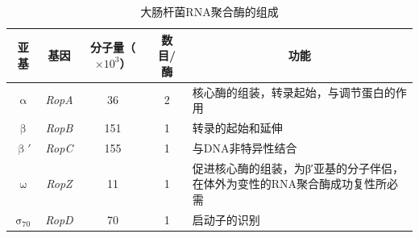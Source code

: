 \begin{table}[h]
	\centering
	\begin{tabular}{|c|c|c|c|m{15em}|}
		\hline
		\textbf{亚基} & \textbf{基因} & \textbf{分子量（$\displaystyle\times 10^{3}$）} & 数目/酶 & \multicolumn{1}{c|}{\textbf{功能}} \\ \hline
		$\upalpha$ & \textit{RopA} & 36 & 2 & 核心酶的组装，转录起始，与调节蛋白的作用 \\ \hline
		$\upbeta$ & \textit{RopB} & 151 & 1 & 转录的起始和延伸 \\ \hline
		$\upbeta'$ & \textit{RopC} & 155 & 1 & 与DNA非特异性结合 \\ \hline
		$\upomega$ & \textit{RopZ} & 11 & 1 & 促进核心酶的组装，为β′亚基的分子伴侣，在体外为变性的RNA聚合酶成功复性所必需 \\ \hline
		$\upsigma_{70}$ & \textit{RopD} & 70 & 1 & 启动子的识别 \\ \hline
	\end{tabular}
	\caption{大肠杆菌RNA聚合酶的组成}
	\label{tab:ecoli_RNAP}
\end{table}


